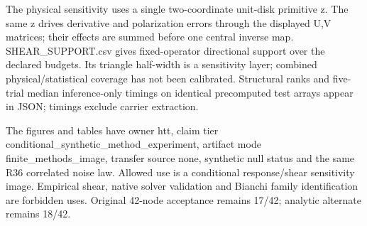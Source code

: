 \documentclass[
]{article}
\begin{document}
The physical sensitivity uses a single two-coordinate unit-disk
primitive z. The same z drives derivative and polarization errors
through the displayed U,V matrices; their effects are summed before one
central inverse map. SHEAR\_SUPPORT.csv gives fixed-operator directional
support over the declared budgets. Its triangle half-width is a
sensitivity layer; combined physical/statistical coverage has not been
calibrated. Structural ranks and five-trial median inference-only
timings on identical precomputed test arrays appear in JSON; timings
exclude carrier extraction.

The figures and tables have owner htt, claim tier
conditional\_\allowbreak{}synthetic\_\allowbreak{}method\_\allowbreak{}experiment, artifact mode
finite\_methods\_image, transfer source none, synthetic null status and
the same R36 correlated noise law. Allowed use is a conditional
response/shear sensitivity image. Empirical shear, native solver
validation and Bianchi family identification are forbidden uses.
Original 42-node acceptance remains 17/42; analytic alternate remains
18/42.
\end{document}
